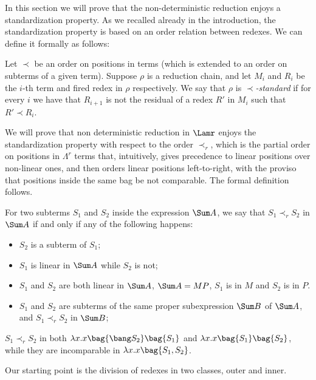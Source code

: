In this section we will prove that the non-deterministic reduction enjoys a standardization property.
As we recalled already in the introduction, the standardization property is based on an order relation between redexes.
We can define it formally as follows:
\begin{definition}
Let $\prec$ be an order on positions in terms (which is extended to an order on
subterms of a given term). Suppose $\rho$ is a reduction chain, and let
$M_i$ and $R_i$ be the $i$-th term and fired redex in $\rho$ respectively.
We say that $\rho$ is \emph{$\prec$-standard} if for every $i$ we have that
$R_{i+1}$ is not the residual of a redex $R'$ in $M_i$ such that $R'\prec R_i$.
\end{definition}

We will prove that non deterministic reduction in $\Lamr$ enjoys the standardization property
with respect to the order $\prec_r$, which is the partial order on positions in $\Lambda^r$ terms that, intuitively,
gives precedence to linear positions over non-linear ones, and then orders
linear positions left-to-right, with the proviso that positions inside the same bag
be not comparable. The formal definition follows.

\begin{definition}\label{def:order}
For two subterms $S_1$ and $S_2$ inside the expression $\Sum A$, we say that
$S_1\prec_r S_2$ in $\Sum A$ if and only if any of the following happens:
\begin{itemize}
 \item $S_2$ is a subterm of $S_1$;
 \item $S_1$ is linear in $\Sum A$ while $S_2$ is not;
 \item $S_1$ and $S_2$ are both linear in $\Sum A$, $\Sum A=MP$, $S_1$ is in $M$ and $S_2$ is in $P$.
 \item $S_1$ and $S_2$ are subterms of the same proper subexpression $\Sum B$ of $\Sum A$, and
 $S_1\prec_r S_2$ in $\Sum B$;
\end{itemize}
\end{definition}
\begin{example}
 $S_1\prec_r S_2$ in both $\lambda x.x\bag{\bang S_2}\bag{S_1}$ and
 $\lambda x.x\bag{S_1}\bag{S_2}$,
 while they are incomparable in $\lambda x.x\bag{S_1,S_2}$.
\end{example}

Our starting point is the division of redexes in two classes, outer and inner.

